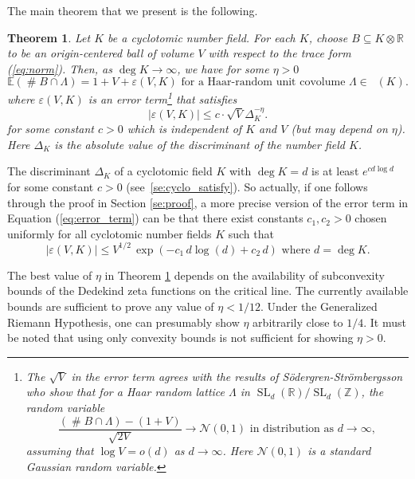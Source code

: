 \documentclass[a4paper]{article}
\newtheorem{theorem}{Theorem}
\theoremstyle{definition}
\theoremstyle{remark}
\DeclareMathOperator{\SL}{SL}
\DeclareMathOperator{\card}{\#}
\DeclareMathOperator{\Ar}{\widetilde{Cl}}
\begin{document}
The main theorem that we present is the following. 
\begin{theorem}
\label{th:main}
Let $K$ be a cyclotomic number field. For each $K$, choose $B \subseteq K \otimes \mathbb{R}$ to be an origin-centered ball of volume $V$ with respect to the trace form (\ref{eq:norm}). Then, as $\deg K \rightarrow \infty$, we have for some $\eta>0$
\begin{equation}
\mathbb{E}(\card B \cap \Lambda) = 1 + V + \varepsilon(V,K)
\text{ for a Haar-random unit covolume }\Lambda \in \Ar(K).
\label{eq:main_estimate}
\end{equation}
where $\varepsilon(V,K)$ is an error term\footnote{The $\sqrt{V}$ in the error term agrees with the results of S\"odergren-Str\"ombergsson \cite{SS19} 
who show that for a Haar random lattice $\Lambda$ in 
$\SL_{d}(\mathbb{R})/\SL_{d}(\mathbb{Z})$, 
the random variable
\begin{equation}
	\frac{(\card B \cap \Lambda) - ( 1 + V  )}{ \sqrt{2V}} \rightarrow \mathcal{N}(0,1) \text{ in distribution as }d \to \infty,
\end{equation}
assuming that $\log V = o(d)$ as $d \rightarrow \infty$. Here $\mathcal{N}(0,1)$ is a standard Gaussian random variable.}
that satisfies
\begin{equation}
	|\varepsilon(V,K)| \leq c \cdot  \sqrt{V}  \Delta_K^{{-\eta}} .
	\label{eq:error_term}
\end{equation}
for some constant $c > 0$ which is independent of $K$ and $V$ (but may depend on $\eta$).
Here $\Delta_{K}$ is the absolute value of the discriminant of the number field $K$.
\end{theorem}

The discriminant $\Delta_K$
of a cyclotomic field $K$ with $\deg K = d$ 
is at least $e^{c d \log d}$ for some constant $c>0$ (see~\cref{se:cyclo_satisfy}). 
{So actually, if one follows through the proof in Section \ref{se:proof},
a more precise version of the error term in Equation (\ref{eq:error_term}) can be that there exist constants $c_1,c_2>0$ chosen uniformly for all cyclotomic number fields $K$ such that 
$$|\varepsilon(V,K)|\leq V^{1/2}\,\exp\left(-c_1\,{d\log(d)}+c_2\,d \right) \text{ where }d= \deg K.$$
}



The best value of $\eta$ in Theorem \ref{th:main} depends on the availability of subconvexity bounds of the Dedekind zeta functions on the critical line. 
The currently available bounds \cite{PY23} are sufficient to prove any value of $\eta<1/12$. 
{ Under the Generalized Riemann Hypothesis, one can presumably show $\eta$ arbitrarily close to $1/4$. }
It must be noted that using only convexity bounds is not sufficient for showing $\eta >0$.
\end{document}
